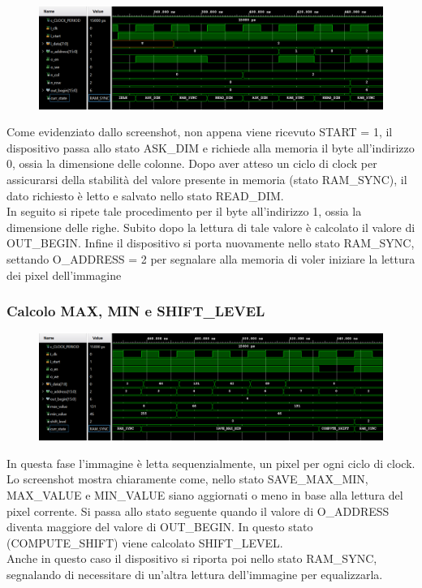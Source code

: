 \documentclass[a4paper, 12pt]{article}
\begin{document}
\begin{figure}[h]
    \centering
    \includegraphics[trim=0cm 1.25cm 0cm 0.25cm, width=1.0\textwidth]{simulazioni/2x2_SRD.png}
    \label{fig:2x2_SRD}
\end{figure}
Come evidenziato dallo screenshot, non appena viene ricevuto START = 1, il dispositivo passa allo stato ASK\_DIM e richiede alla memoria il byte all'indirizzo 0, ossia la dimensione delle colonne. 
Dopo aver atteso un ciclo di clock per assicurarsi della stabilità del valore presente in memoria (stato RAM\_SYNC), il dato richiesto è letto e salvato nello stato READ\_DIM. \\
In seguito si ripete tale procedimento per il byte all'indirizzo 1, ossia la dimensione delle righe.
Subito dopo la lettura di tale valore è calcolato il valore di OUT\_BEGIN. 
Infine il dispositivo si porta nuovamente nello stato RAM\_SYNC, settando O\_ADDRESS = 2 per segnalare alla memoria di voler iniziare la lettura dei pixel dell'immagine

\subsubsection*{Calcolo MAX, MIN e SHIFT\_LEVEL}
\begin{figure}[h]
    \centering
    \includegraphics[trim=0cm 1.25cm 0cm 0.25cm, width=1\textwidth]{simulazioni/2x2_MMSL.png}
    \label{fig:2x2_MMSL}
\end{figure}
In questa fase l'immagine è letta sequenzialmente, un pixel per ogni ciclo di clock. \\
Lo screenshot mostra chiaramente come, nello stato SAVE\_MAX\_MIN, MAX\_VALUE e MIN\_VALUE siano aggiornati o meno in base alla lettura del pixel corrente. Si passa allo stato seguente  quando il valore di O\_ADDRESS diventa maggiore del valore di OUT\_BEGIN. In questo stato (COMPUTE\_SHIFT) viene calcolato SHIFT\_LEVEL. \\
Anche in questo caso il dispositivo si riporta poi nello stato RAM\_SYNC, segnalando di necessitare di un'altra lettura dell'immagine per equalizzarla.
\end{document}
